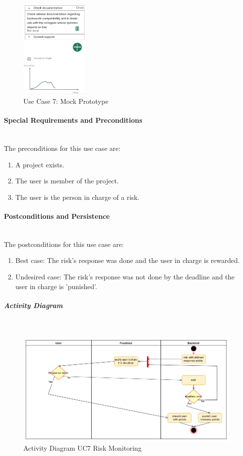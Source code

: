 \begin{figure}[H]
	\centering
	\includegraphics[width=0.3\textwidth]{Assets/UC_Screenshots/UC7S.png}
	\caption{Use Case 7: Mock Prototype}
	\label{fig:useCase7Detail}
\end{figure}

\paragraph*{Special Requirements and Preconditions}\mbox{}\\
The preconditions for this use case are:
\begin{enumerate}
	\vspace{-3mm}
	\setlength\itemsep{-1em}
	
	\item A project exists.
	\item The user is member of the project.
	\item The user is the person in charge of a risk.
\end{enumerate}

\paragraph*{Postconditions and Persistence}\mbox{}\\
The postconditions for this use case are:
\begin{enumerate}
	\vspace{-3mm}
	\setlength\itemsep{-1em}
	
	\item Best case: The risk's response was done and the user in charge is rewarded.
	\item Undesired case: The risk's response was not done by the deadline and the user in charge is 'punished'.
\end{enumerate}

\subparagraph{Activity Diagram}\mbox{}\\
\begin{figure}[H]
	\centering
	\includegraphics[width=1.0\textwidth]{Content/Domain/UC7RiskMonitoring.png}
	\caption{Activity Diagram \ac{UC}7 Risk Monitoring}
	\label{fig:label77}
\end{figure}